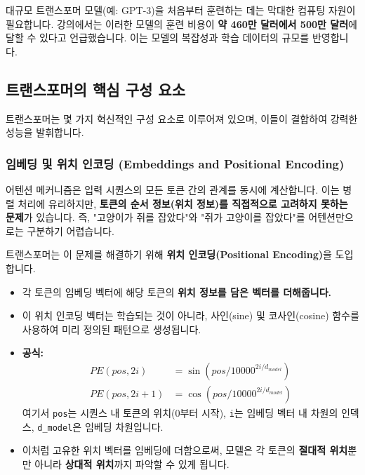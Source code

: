 \documentclass[11pt,a4paper]{article}
\theoremstyle{definition}
\begin{document}
\begin{tcolorbox}[warning, title={트랜스포머 학습 비용}]
대규모 트랜스포머 모델(예: GPT-3)을 처음부터 훈련하는 데는 막대한 컴퓨팅 자원이 필요합니다. 강의에서는 이러한 모델의 훈련 비용이 \textbf{약 460만 달러에서 500만 달러}에 달할 수 있다고 언급했습니다. 이는 모델의 복잡성과 학습 데이터의 규모를 반영합니다.
\end{tcolorbox}

\subsection{트랜스포머의 핵심 구성 요소}
트랜스포머는 몇 가지 혁신적인 구성 요소로 이루어져 있으며, 이들이 결합하여 강력한 성능을 발휘합니다.

\subsubsection{임베딩 및 위치 인코딩 (Embeddings and Positional Encoding)}
\begin{tcolorbox}[mybox, title={문제점: 어텐션의 순서 정보 부족}]
어텐션 메커니즘은 입력 시퀀스의 모든 토큰 간의 관계를 동시에 계산합니다. 이는 병렬 처리에 유리하지만, \textbf{토큰의 순서 정보(위치 정보)를 직접적으로 고려하지 못하는 문제}가 있습니다. 즉, "고양이가 쥐를 잡았다"와 "쥐가 고양이를 잡았다"를 어텐션만으로는 구분하기 어렵습니다.
\end{tcolorbox}

\begin{tcolorbox}[summary, title={해결책: 위치 인코딩 (Positional Encoding)}]
트랜스포머는 이 문제를 해결하기 위해 \textbf{위치 인코딩(Positional Encoding)}을 도입합니다.
\begin{itemize}
    \item 각 토큰의 임베딩 벡터에 해당 토큰의 \textbf{위치 정보를 담은 벡터를 더해줍니다.}
    \item 이 위치 인코딩 벡터는 학습되는 것이 아니라, 사인(sine) 및 코사인(cosine) 함수를 사용하여 미리 정의된 패턴으로 생성됩니다.
    \item \textbf{공식:}
    \begin{align*}
        PE(pos, 2i) &= \sin(pos / 10000^{2i/d_{model}}) \\
        PE(pos, 2i+1) &= \cos(pos / 10000^{2i/d_{model}})
    \end{align*}
    여기서 \texttt{pos}는 시퀀스 내 토큰의 위치(0부터 시작), \texttt{i}는 임베딩 벡터 내 차원의 인덱스, \texttt{d_model}은 임베딩 차원입니다.
    \item 이처럼 고유한 위치 벡터를 임베딩에 더함으로써, 모델은 각 토큰의 \textbf{절대적 위치}뿐만 아니라 \textbf{상대적 위치}까지 파악할 수 있게 됩니다.
\end{itemize}
\end{tcolorbox}
\end{document}
